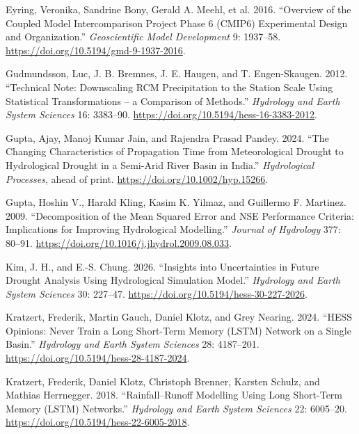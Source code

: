 \documentclass[
  english,
  11pt,
]{article}
\newlength{\cslhangindent}
\newenvironment{CSLReferences}[2] %
 {\begin{list}{}{%
  \setlength{\itemindent}{0pt}
  \setlength{\leftmargin}{0pt}
  \setlength{\parsep}{0pt}
  \ifodd #1
   \setlength{\leftmargin}{\cslhangindent}
   \setlength{\itemindent}{-1\cslhangindent}
  \fi
  \setlength{\itemsep}{#2\baselineskip}}}
 {\end{list}}
\begin{document}
\begin{CSLReferences}{1}{1}
Eyring, Veronika, Sandrine Bony, Gerald A. Meehl, et al. 2016.
{``Overview of the Coupled Model Intercomparison Project Phase 6
({CMIP6}) Experimental Design and Organization.''} \emph{Geoscientific
Model Development} 9: 1937--58.
\url{https://doi.org/10.5194/gmd-9-1937-2016}.

Gudmundsson, Luc, J. B. Bremnes, J. E. Haugen, and T. Engen-Skaugen.
2012. {``Technical Note: Downscaling {RCM} Precipitation to the Station
Scale Using Statistical Transformations -- a Comparison of Methods.''}
\emph{Hydrology and Earth System Sciences} 16: 3383--90.
\url{https://doi.org/10.5194/hess-16-3383-2012}.

Gupta, Ajay, Manoj Kumar Jain, and Rajendra Prasad Pandey. 2024. {``The
Changing Characteristics of Propagation Time from Meteorological Drought
to Hydrological Drought in a Semi-Arid River Basin in {India}.''}
\emph{Hydrological Processes}, ahead of print.
\url{https://doi.org/10.1002/hyp.15266}.

Gupta, Hoshin V., Harald Kling, Kasim K. Yilmaz, and Guillermo F.
Martinez. 2009. {``Decomposition of the Mean Squared Error and {NSE}
Performance Criteria: Implications for Improving Hydrological
Modelling.''} \emph{Journal of Hydrology} 377: 80--91.
\url{https://doi.org/10.1016/j.jhydrol.2009.08.033}.

Kim, J. H., and E.-S. Chung. 2026. {``Insights into Uncertainties in
Future Drought Analysis Using Hydrological Simulation Model.''}
\emph{Hydrology and Earth System Sciences} 30: 227--47.
\url{https://doi.org/10.5194/hess-30-227-2026}.

Kratzert, Frederik, Martin Gauch, Daniel Klotz, and Grey Nearing. 2024.
{``{HESS Opinions}: Never Train a {Long Short-Term Memory} ({LSTM})
Network on a Single Basin.''} \emph{Hydrology and Earth System Sciences}
28: 4187--201. \url{https://doi.org/10.5194/hess-28-4187-2024}.

Kratzert, Frederik, Daniel Klotz, Christoph Brenner, Karsten Schulz, and
Mathias Herrnegger. 2018. {``Rainfall--Runoff Modelling Using {Long
Short-Term Memory} ({LSTM}) Networks.''} \emph{Hydrology and Earth
System Sciences} 22: 6005--20.
\url{https://doi.org/10.5194/hess-22-6005-2018}.


\end{CSLReferences}
\end{document}
